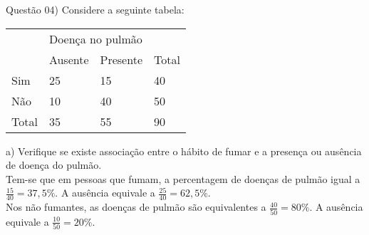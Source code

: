 
\noindent \textcolor{COLOR1}{Questão 04)} Considere a seguinte tabela:
\\

\begin{table}[ht]
    \centering
    \begin{tabular}{l|l|l|l}
        \hline
        \rowcolor{pagecolor!50!COLOR1}
        \multicolumn{1}{c|}{\cellcolor{pagecolor!50!COLOR1}}                                    & \multicolumn{2}{l|}{\cellcolor{pagecolor!50!COLOR1}Doença no pulmão} & \cellcolor{pagecolor!50!COLOR1}                                                          \\ \cline{2-3}
        \rowcolor{pagecolor!50!COLOR1}
        \multicolumn{1}{c|}{\multirow{-2}{*}{\cellcolor{pagecolor!50!COLOR1}{Hábito de fumar}}} & Ausente                                                              & Presente                        & \multirow{-2}{*}{\cellcolor{pagecolor!50!COLOR1}Total} \\ \hline \hline
        Sim                                                                                     & 25                                                                   & 15                              & 40                                                     \\ \hline
        Não                                                                                     & 10                                                                   & 40                              & 50                                                     \\ \hline
        Total                                                                                   & 35                                                                   & 55                              & 90                                                     \\ \hline
    \end{tabular}
\end{table}


a) Verifique se existe associação entre o hábito de fumar e a presença ou ausência de doença do pulmão.
\\

Tem-se que em pessoas que fumam, a percentagem de doenças de pulmão igual a $\frac{15}{40} = 37,5\%$. A ausência equivale a $\frac{25}{40} = 62,5\%$.
\\

Nos não fumantes, as doenças de pulmão são equivalentes a $\frac{40}{50} = 80 \%$. A ausência equivale a $\frac{10}{50} = 20\%$.
\\

